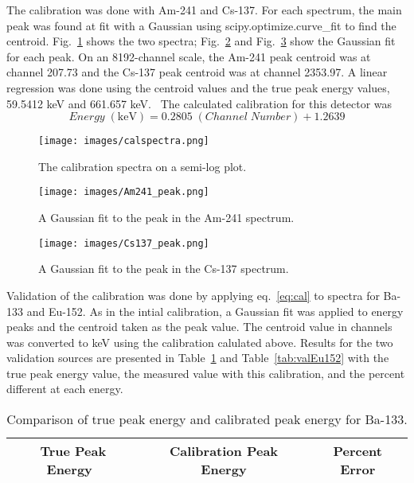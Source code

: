 The calibration was done with Am-241 and Cs-137. For each spectrum, the main peak was found at fit with a Gaussian using scipy.optimize.curve\_fit to find the centroid. Fig.~\ref{fig:calspectra} shows the two spectra; Fig.~\ref{fig:Am241peak} and Fig.~\ref{fig:Cs137peak} show the Gaussian fit for each peak. On an 8192-channel scale, the Am-241 peak centroid was at channel 207.73 and the Cs-137 peak centroid was at channel 2353.97. A linear regression was done using the centroid values and the true peak energy values, 59.5412 keV and 661.657 keV.~\cite{lblndata} The calculated calibration for this detector was
\begin{equation}
  \label{eq:cal} 
  Energy \; \mathrm{ (keV)} = 0.2805 \; (Channel \; Number) + 1.2639 
\end{equation}

\begin{figure}[H]
  \centering
  \texttt{[image: images/calspectra.png]} 
  \caption{The calibration spectra on a semi-log plot.} 
  \label{fig:calspectra} 
\end{figure}
 
\begin{figure}[H]
  \centering
  \texttt{[image: images/Am241\_peak.png]} 
  \caption{A Gaussian fit to the peak in the Am-241 spectrum.} 
  \label{fig:Am241peak} 
\end{figure}

\begin{figure}[H]
  \centering
  \texttt{[image: images/Cs137\_peak.png]} 
  \caption{A Gaussian fit to the peak in the Cs-137 spectrum.} 
  \label{fig:Cs137peak} 
\end{figure}

Validation of the calibration was done by applying eq.~\ref{eq:cal} to spectra for Ba-133 and Eu-152. As in the intial calibration, a Gaussian fit was applied to energy peaks and the centroid taken as the peak value. The centroid value in channels was converted to keV using the calibration calulated above. Results for the two validation sources are presented in Table~\ref{tab:valBa133} and Table~\ref{tab:valEu152} with the true peak energy value, the measured value with this calibration, and the percent different at each energy. 

\begin{table}[H]
  \centering 
  \caption{Comparison of true peak energy and calibrated peak energy for Ba-133.} 
  \begin{tabular}{|ccc|} 
    \hline 
    True Peak Energy~\cite{lblndata} & Calibration Peak Energy & Percent Error \\ 
    \hline 
    
    \hline  
  \end{tabular} 
  \label{tab:valBa133}
\end{table} 

